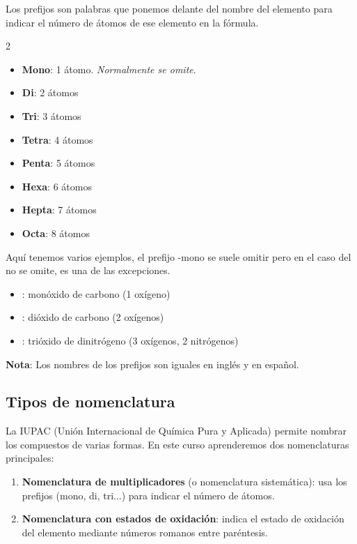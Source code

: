 Los prefijos son palabras que ponemos delante del nombre del elemento para indicar el número de átomos de ese elemento en la fórmula.

\begin{multicols}{2}
    \begin{itemize}
        \item \textbf{Mono}: 1 átomo. \textit{Normalmente se omite}.
        \item \textbf{Di}: 2 átomos
        \item \textbf{Tri}: 3 átomos
        \item \textbf{Tetra}: 4 átomos
        \item \textbf{Penta}: 5 átomos
        \item \textbf{Hexa}: 6 átomos
        \item \textbf{Hepta}: 7 átomos
        \item \textbf{Octa}: 8 átomos
    \end{itemize}
\end{multicols}

\begin{example}
    Aquí tenemos varios ejemplos, el prefijo -mono se suele omitir pero en el caso del  no se omite, es una de las excepciones.
    \begin{itemize}
        \item {}: monóxido de carbono (1 oxígeno)
        \item {}: dióxido de carbono (2 oxígenos)
        \item {}: trióxido de dinitrógeno (3 oxígenos, 2 nitrógenos)
    \end{itemize}
\end{example}

\textbf{Nota}: Los nombres de los prefijos son iguales en inglés y en español.

\subsection{Tipos de nomenclatura}

La IUPAC (Unión Internacional de Química Pura y Aplicada) permite nombrar los compuestos de varias formas. En este curso aprenderemos dos nomenclaturas principales:

\begin{enumerate}[label=\letraminuscula]
        \item \textbf{Nomenclatura de multiplicadores} (o nomenclatura sistemática): usa los prefijos (mono, di, tri...) para indicar el número de átomos.

        \item \textbf{Nomenclatura con estados de oxidación}: indica el estado de oxidación del elemento mediante números romanos entre paréntesis.
\end{enumerate}

